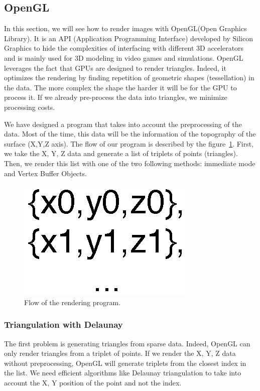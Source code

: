 \subsection{OpenGL}

In this section, we will see how to render images with OpenGL(Open Graphics Library). It is an API (Application Programming Interface) developed by Silicon Graphics to hide the complexities of interfacing with different 3D accelerators and is mainly used for 3D modeling in video games and simulations. OpenGL leverages the fact that GPUs are designed to render triangles. Indeed, it optimizes the rendering by finding repetition of geometric shapes (tessellation) in the data. The more complex the shape the harder it will be for the GPU to process it. If we already pre-process the data into triangles, we minimize processing costs. \cite{abobegpu}

We have designed a program that takes into account the preprocessing of the data. Most of the time, this data will be the information of the topography of the surface  (X,Y,Z axis). The flow of our program is described by the figure~\ref{fig:timelinerendering}. First, we take the X, Y, Z data and generate a list of triplets of points (triangles). Then, we render this list with one of the two following methods: immediate mode and Vertex Buffer Objects.

\begin{figure}[!ht]
  \centering
  \includegraphics[scale=0.40]{images/timelinerendering.eps}
    \caption{Flow of the rendering program.}
  \label{fig:timelinerendering}
\end{figure}


\subsubsection{Triangulation with Delaunay}

The first problem is generating triangles from sparse data. Indeed, OpenGL can only render triangles from a triplet of points. If we render the X, Y, Z data without preprocessing, OpenGL will generate triplets from the closest index in the list. We need efficient algorithms like Delaunay triangulation to take into account the X, Y position of the point and not the index.

